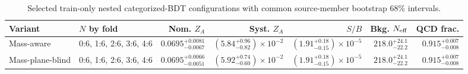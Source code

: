 \begin{table}[tb]
  \centering
  \footnotesize
  \caption{Selected train-only nested categorized-BDT configurations with common source-member bootstrap 68\% intervals.}
  \label{tab:c7w-selected}
  \begin{tabular}{llrrrrr}
    \toprule
    Variant & $N$ by fold & Nom. $Z_A$ & Syst. $Z_A$ & $S/B$ & Bkg. $N_{\rm eff}$ & QCD frac. \\
    \midrule
    Mass-aware & 0:6, 1:6, 2:6, 3:6, 4:6 & $0.0695^{+0.0081}_{-0.0067}$ & $(5.84^{+0.96}_{-0.82})\times10^{-2}$ & $(1.91^{+0.18}_{-0.15})\times10^{-5}$ & $218.0^{+24.1}_{-22.2}$ & $0.915^{+0.007}_{-0.008}$ \\
    Mass-plane-blind & 0:6, 1:6, 2:6, 3:6, 4:6 & $0.0695^{+0.0066}_{-0.0051}$ & $(5.92^{+0.74}_{-0.60})\times10^{-2}$ & $(1.91^{+0.18}_{-0.15})\times10^{-5}$ & $218.0^{+24.1}_{-22.2}$ & $0.915^{+0.007}_{-0.008}$ \\
    \bottomrule
  \end{tabular}
\end{table}
